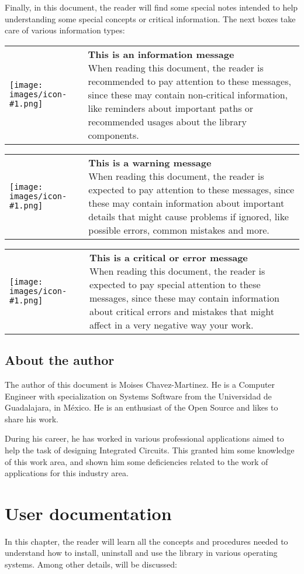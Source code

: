 \documentclass[11pt,twoside,openany,x11names,svgnames]{memoir}
\makeatletter
\newcommand\chapterillustration{}
\newcommand{\IconNote}[3]
{
	\begin{table}[ht]
	\begin{tabular}{ lm{\dimexpr\textwidth-8\tabcolsep-\wd0}@{}}
		\toprule
		\texttt{[image: images/icon-\#1.png]}
		&
		\parbox[t]{155mm}{
		\textbf{#2} \\
		#3
		}
	\end{tabular}
\end{table}
}
\makeatother
\begin{document}
Finally, in this document, the reader will find some special notes intended to help understanding some special concepts or critical information. The next boxes take care of various information types:

\IconNote
	{info}
	{This is an information message}
	{When reading this document, the reader is recommended to pay attention to these messages, since these may contain non-critical information, like reminders about important paths or recommended usages about the library components.}

\IconNote
	{warning}
	{This is a warning message}
	{When reading this document, the reader is expected to pay attention to these messages, since these may contain information about important details that might cause problems if ignored, like possible errors, common mistakes and more.}

\IconNote
	{error}
	{This is a critical or error message}
	{When reading this document, the reader is expected to pay special attention to these messages, since these may contain information about critical errors and mistakes that might affect in a very negative way your work.}

\section{About the author}\label{About-The-Author}
 
The author of this document is Moises Chavez-Martinez. He is a Computer Engineer with specialization on Systems Software from the Universidad de Guadalajara, in M\'exico. He is an enthusiast of the Open Source and likes to share his work.

During his career, he has worked in various professional applications aimed to help the task of designing Integrated Circuits. This granted him some knowledge of this work area, and shown him some deficiencies related to the work of applications for this industry area.

\renewcommand\chapterillustration{images/chapter02-cover}
\chapter{User documentation}\label{User-documentation}

In this chapter, the reader will learn all the concepts and procedures needed to understand how to install, uninstall and use the library in various operating systems. Among other details, will be discussed:
\end{document}
